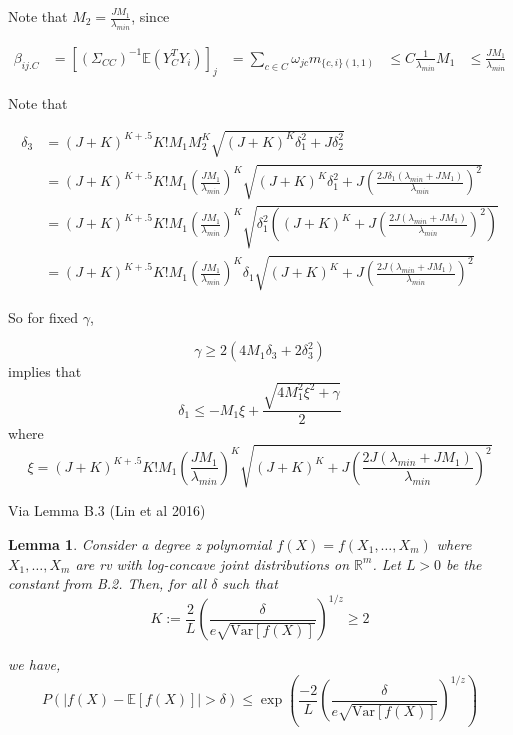 \documentclass[]{article}
\newtheorem{lemma}{Lemma}
\newcommand{\E}{\mathbb{E}}
\begin{document}
Note that $M_2 = \frac{J M_1}{\lambda_{min}}$, since

\begin{equation}
\begin{aligned}
\beta_{ij.C} &= \left[(\Sigma_{CC})^{-1} \E(Y_C^T Y_i)\right]_j
& = \sum_{c \in C} \omega_{jc}m_{\{c,i\}(1,1)}
& \leq C\frac{1}{\lambda_{min}}M_1
& \leq \frac{J M_1}{\lambda_{min}}
\end{aligned}
\end{equation}

Note that

\begin{equation}
\begin{aligned}
\delta_3 & = (J +K)^{K + .5}K!M_1M_2^K \sqrt{(J+K)^K\delta_1^2 + J \delta_2^2}\\
&= (J +K)^{K + .5}K!M_1\left(\frac{J M_1}{\lambda_{min}}\right)^K \sqrt{(J+K)^K\delta_1^2 + J \left(\frac{2J \delta_1 \left( \lambda_{min} + J M_1\right)}{\lambda_{min}} \right)^2}
\\
&= (J +K)^{K + .5}K!M_1\left(\frac{J M_1}{\lambda_{min}}\right)^K \sqrt{\delta_1^2 \left((J+K)^K + J \left(\frac{2J\left( \lambda_{min} + J M_1\right)}{\lambda_{min}} \right)^2\right)}
\\
&= (J +K)^{K + .5}K!M_1\left(\frac{J M_1}{\lambda_{min}}\right)^K \delta_1\sqrt{ (J+K)^K + J \left(\frac{2J\left( \lambda_{min} + J M_1\right)}{\lambda_{min}} \right)^2}
\end{aligned}
\end{equation}

So for fixed $\gamma$, 

\[\gamma \geq 2 \left(4M_1\delta_3 + 2\delta_3^2\right)\]
implies that
\begin{equation}
\delta_1 \leq -M_1\xi + \frac{\sqrt{4 M_1^2\xi^2 + \gamma}}{2}
\end{equation}
where 
\[\xi = (J +K)^{K + .5}K!M_1\left(\frac{J M_1}{\lambda_{min}}\right)^K \sqrt{ (J+K)^K + J \left(\frac{2J\left( \lambda_{min} + J M_1\right)}{\lambda_{min}} \right)^2}\]

Via Lemma B.3 (Lin et al 2016)
\begin{lemma}
Consider a degree z polynomial $f(X) = f(X_1, \ldots, X_m)$ where $X_1, \ldots, X_m$ are rv with log-concave joint distributions on $\mathbb{R}^m$. Let $L > 0 $ be the constant from B.2. Then, for all $\delta$ such that 
\[K:= \frac{2}{L} \left(\frac{\delta}{e\sqrt{\text{Var}\left[f(X)\right]}}\right)^{1/z} \geq 2\]

we have,
\[P(|f(X) - \mathbb{E}\left[f(X)\right] | > \delta ) \leq \exp\left(\frac{-2}{L} \left(\frac{\delta}{e\sqrt{\text{Var}\left[f(X)\right]}}\right)^{1/z}\right)\]
\end{lemma}
\end{document}
